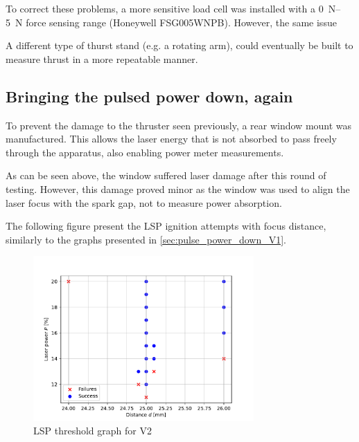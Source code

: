 
            To correct these problems, a more sensitive load cell was installed with a \qtyrange{0}{5}{N} force sensing range (Honeywell FSG005WNPB). However, the same issue 

            A different type of thurst stand (e.g. a rotating arm), could eventually be built to measure thrust in a more repeatable manner.

        \subsection{Bringing the pulsed power down, again}
            
            To prevent the damage to the thruster seen previously, a rear window mount was manufactured. This allows the laser energy that is not absorbed to pass freely through the apparatus, also enabling power meter measurements. 
            

            As can be seen above, the window suffered laser damage after this round of testing. However, this damage proved minor as the window was used to align the laser focus with the spark gap, not to measure power absorption.
            
            The following figure present the LSP ignition attempts with focus distance, similarly to the graphs presented in \autoref{sec:pulse_power_down_V1}.

            \begin{figure}
                \centering
                \includegraphics[width=0.75\textwidth]{assets/5 results/V2_focus_threshold.pdf}
                \caption{LSP threshold graph for V2}
            \end{figure}

